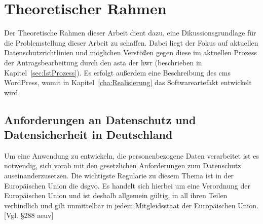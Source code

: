 


\chapter{Theoretischer Rahmen}\label{cha:Theoretischer_Rahmen}
Der Theoretische Rahmen dieser Arbeit dient dazu, eine Dikussionsgrundlage für die Problemstellung dieser Arbeit zu schaffen. Dabei liegt der Fokus auf aktuellen Datenschutzrichtlinien und möglichen Verstößen gegen diese im aktuellen Prozess der Antragsbearbeitung durch den \gls{asta} der \gls{hwr} (beschrieben in Kapitel~\ref{sec:IstProzess}). Es erfolgt außerdem eine Beschreibung des \gls{cms} WordPress, womit in Kapitel~\ref{cha:Realisierung} das Softwareartefakt entwickelt wird. 

\section{Anforderungen an Datenschutz und Datensicherheit in Deutschland}\label{sec:Anforderungen}
Um eine Anwendung zu entwickeln, die personenbezogene Daten verarbeitet ist es notwendig, sich vorab mit den gesetzlichen Anforderungen zum Datenschutz auseinanderzusetzen. Die wichtigste Regularie zu diesem Thema ist in der Europäischen Union  die \gls{dsgvo}. Es handelt sich hierbei um eine Verordnung der Europäischen Union und ist deshalb allgemein gültig, in all ihren Teilen verbindlich und gilt unmittelbar in jedem Mitgleidsstaat der Europäischen Union. [Vgl. §288 \gls{aeuv}]

